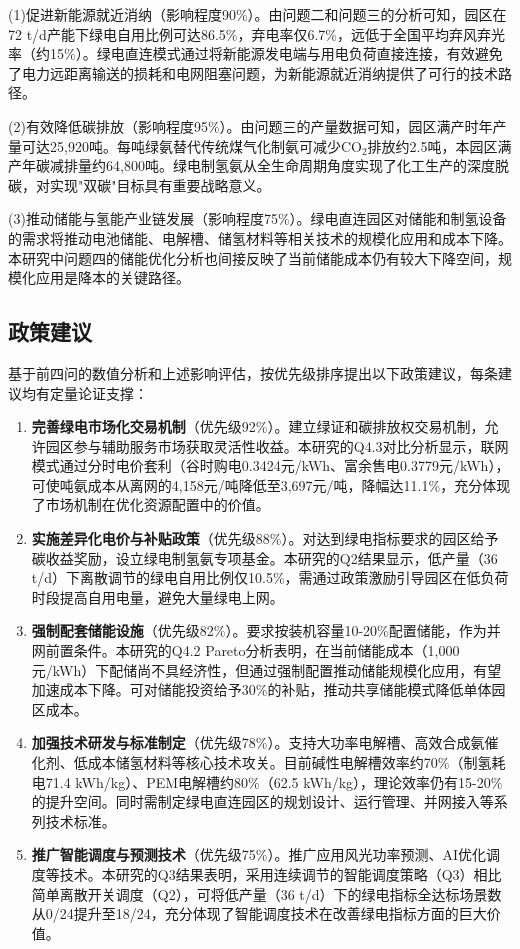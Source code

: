 (1)促进新能源就近消纳（影响程度90\%）。由问题二和问题三的分析可知，园区在72 t/d产能下绿电自用比例可达86.5\%，弃电率仅6.7\%，远低于全国平均弃风弃光率（约15\%）\cite{li2023}。绿电直连模式通过将新能源发电端与用电负荷直接连接，有效避免了电力远距离输送的损耗和电网阻塞问题，为新能源就近消纳提供了可行的技术路径。

(2)有效降低碳排放（影响程度95\%）。由问题三的产量数据可知，园区满产时年产量可达25,920吨。每吨绿氨替代传统煤气化制氨可减少CO$_2$排放约2.5吨，本园区满产年碳减排量约64,800吨。绿电制氢氨从全生命周期角度实现了化工生产的深度脱碳，对实现"双碳"目标具有重要战略意义。

(3)推动储能与氢能产业链发展（影响程度75\%）。绿电直连园区对储能和制氢设备的需求将推动电池储能、电解槽、储氢材料等相关技术的规模化应用和成本下降\cite{irena2024}。本研究中问题四的储能优化分析也间接反映了当前储能成本仍有较大下降空间，规模化应用是降本的关键路径。

\subsection{政策建议}

基于前四问的数值分析和上述影响评估，按优先级排序提出以下政策建议，每条建议均有定量论证支撑：

\begin{enumerate}
    \item \textbf{完善绿电市场化交易机制}（优先级92\%）。建立绿证和碳排放权交易机制，允许园区参与辅助服务市场获取灵活性收益。本研究的Q4.3对比分析显示，联网模式通过分时电价套利（谷时购电0.3424元/kWh、富余售电0.3779元/kWh），可使吨氨成本从离网的4,158元/吨降低至3,697元/吨，降幅达11.1\%，充分体现了市场机制在优化资源配置中的价值。
    
    \item \textbf{实施差异化电价与补贴政策}（优先级88\%）。对达到绿电指标要求的园区给予碳收益奖励，设立绿电制氢氨专项基金。本研究的Q2结果显示，低产量（36 t/d）下离散调节的绿电自用比例仅10.5\%，需通过政策激励引导园区在低负荷时段提高自用电量，避免大量绿电上网。
    
    \item \textbf{强制配套储能设施}（优先级82\%）。要求按装机容量10-20\%配置储能，作为并网前置条件。本研究的Q4.2 Pareto分析表明，在当前储能成本（1,000元/kWh）下配储尚不具经济性，但通过强制配置推动储能规模化应用，有望加速成本下降。可对储能投资给予30\%的补贴，推动共享储能模式降低单体园区成本。
    
    \item \textbf{加强技术研发与标准制定}（优先级78\%）。支持大功率电解槽、高效合成氨催化剂、低成本储氢材料等核心技术攻关。目前碱性电解槽效率约70\%（制氢耗电71.4 kWh/kg）、PEM电解槽约80\%（62.5 kWh/kg），理论效率仍有15-20\%的提升空间。同时需制定绿电直连园区的规划设计、运行管理、并网接入等系列技术标准。
    
    \item \textbf{推广智能调度与预测技术}（优先级75\%）。推广应用风光功率预测、AI优化调度等技术。本研究的Q3结果表明，采用连续调节的智能调度策略（Q3）相比简单离散开关调度（Q2），可将低产量（36 t/d）下的绿电指标全达标场景数从0/24提升至18/24，充分体现了智能调度技术在改善绿电指标方面的巨大价值\cite{zhang2023}。
\end{enumerate}
